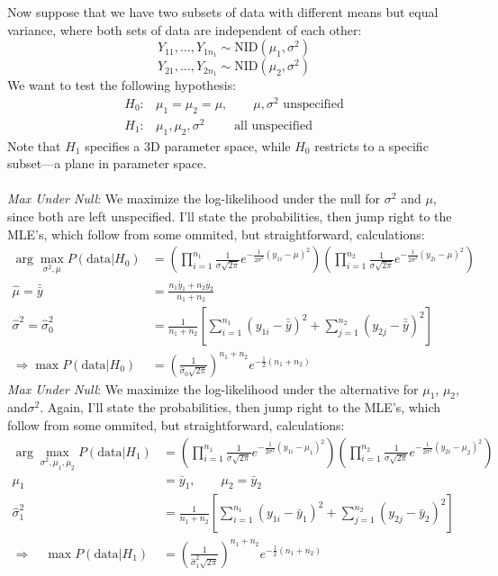 \documentclass[a4paper,12pt]{scrartcl}
\begin{document}
Now suppose that we have two subsets of data with different means
but equal variance, where both sets of data are independent of each
other:
   \[ Y_{11}, \ldots, Y_{1n_1} \sim \text{NID}(\mu_1, \sigma^2) \]
   \[ Y_{21}, \ldots, Y_{2n_1} \sim \text{NID}(\mu_2, \sigma^2) \]
We want to test the following hypothesis:
\begin{align*}
   H_0:& \mu_1 = \mu_2 = \mu, \qquad \mu, \sigma^2 
      \text{ unspecified} \\
    H_1:& \mu_1, \mu_2, \sigma^2 \qquad \text{ all unspecified} 
\end{align*}
Note that $H_1$ specifies a 3D parameter space, while $H_0$ restricts
to a specific subset---a plane in parameter space.
\\
\\
{\sl Max Under Null}: We maximize the log-likelihood under the null
for $\sigma^2$ and $\mu$, since both are left unspecified.
I'll state the probabilities, then jump right to
the MLE's, which follow from some ommited, but straightforward, 
calculations:
\begin{align*}
   \arg \max_{\sigma^2, \mu} 
   P(\text{data} | H_0) &= \left( \prod^{n_1}_{i=1} \frac{1}{\sigma
      \sqrt{2\pi}} e^{-\frac{1}{2\sigma^2} (y_{1i} - \mu)^2} 
      \right) \left( \prod^{n_2}_{i=1} \frac{1}{\sigma
	 \sqrt{2\pi}} e^{-\frac{1}{2\sigma^2} (y_{2i} - \mu)^2} 
      \right)\\
   \hat{\mu} = \bar{\bar{y}}&= 
      \frac{n_1 \bar{y}_1 + n_2 \bar{y}_2}{n_1 + n_2}\\
   \hat{\sigma}^2 = \hat{\sigma}^2_0 &= \frac{1}{n_1 + n_2} 
   \left[ \sum_{i=1}^{n_1} (y_{1i} - \bar{\bar{y}})^2 + 
	 \sum_{j=1}^{n_2} (y_{2j} - \bar{\bar{y}})^2 \right]\\
   \Rightarrow \max P(\text{data} | H_0) &=
      \left( \frac{1}{\hat{\sigma}_0 \sqrt{2\pi}}\right)^{n_1+n_2}
      e^{-\frac{1}{2} (n_1+n_2)}
\end{align*}
{\sl Max Under Null}: We maximize the log-likelihood under the 
alternative for $\mu_1$, $\mu_2$, and$\sigma^2$. Again, I'll state the 
probabilities, then jump right to
the MLE's, which follow from some ommited, but straightforward, 
calculations:
\begin{align*}
   \arg \max_{\sigma^2, \mu_1,\mu_2} 
   P(\text{data} | H_1) &= \left( \prod^{n_1}_{i=1} \frac{1}{\sigma
      \sqrt{2\pi}} e^{-\frac{1}{2\sigma^2} (y_{1i} - \mu_1)^2} 
      \right) \left( \prod^{n_2}_{i=1} \frac{1}{\sigma
	 \sqrt{2\pi}} e^{-\frac{1}{2\sigma^2} (y_{2i} - \mu_2)^2} 
      \right)\\
   \mu_1 &= \bar{y}_1, \qquad \mu_2 = \bar{y}_2\\
      \hat{\sigma}^2_1 &= \frac{1}{n_1+n_2} \left[
      \sum^{n_1}_{i=1} (y_{1i} - \bar{y}_1)^2 +
      \sum^{n_2}_{j=1} (y_{2j} - \bar{y}_2)^2\right]\\
   \Rightarrow \quad \max P(\text{data} | H_1) &= 
      \left( \frac{1}{\hat{\sigma}^2_1\sqrt{2\pi}} \right)^{n_1+n_2}
      e^{-\frac{1}{2}(n_1+n_2)}
\end{align*}
\end{document}
